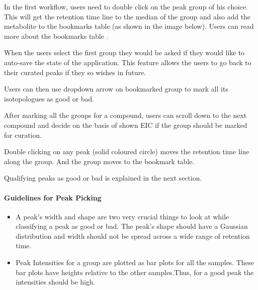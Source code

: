 \documentclass[letterpaper,10pt,english,openany,oneside]{sphinxmanual}
\begin{document}
In the first workflow, users need to double click on the peak group of his choice. This will get the retention time line to the median of the group and also add the metabolite to the bookmarks table (as shown in the image below). Users can read more about the bookmarks table .



When the users select the first group they would be asked if they would like to auto-save the state of the application. This feature allows the users to go back to their curated peaks if they so wishes in future.


Users can then use dropdown arrow on bookmarked group to mark all its isotopologues as good or bad.


After marking all the groups for a compound, users can scroll down to the next compound and decide on the basis of shown EIC if the group should be marked for curation.


Double clicking on any peak (solid coloured circle) moves the retention time line along the group. And the group moves to the bookmark table.


Qualifying peaks as good or bad is explained in the next section.


\paragraph{Guidelines for Peak Picking}
\label{\detokenize{LabeledLCMSWorkflow:guidelines-for-peak-picking}}\begin{itemize}
\item {} 
A peak’s width and shape are two very crucial things to look at while classifying a peak as good or bad. The peak’s shape should have a Gaussian distribution and width should not be spread across a wide range of retention time.

\end{itemize}

\begin{itemize}
\item {} 
Peak Intensities for a group are plotted as bar plots for all the samples. These bar plots have heights relative to the other samples.Thus, for a good peak the intensities should be high.

\end{itemize}
\end{document}
